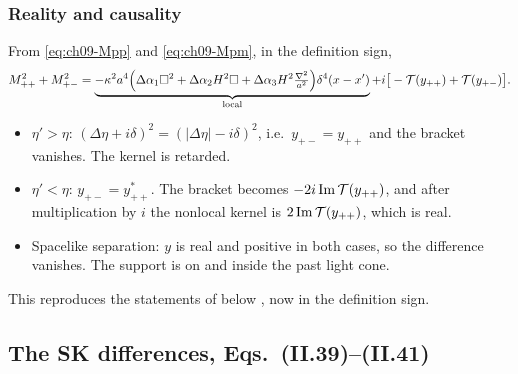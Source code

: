 \subsubsection{Reality and causality}
From \eqref{eq:ch09-Mpp} and \eqref{eq:ch09-Mpm}, in the definition sign,
\begin{equation}
M^2_{++}+M^2_{+-}=\underbrace{-\kappa^2a^4\Big(\Delta\alpha_1\square^2+\Delta\alpha_2H^2\square+\Delta\alpha_3H^2\tfrac{\nabla^2}{a^2}\Big)\delta^4(x-x')}_{\text{local}}
+i\big[-\mathcal{T}(y_{++})+\mathcal{T}(y_{+-})\big].
\label{eq:ch09-retarded}
\end{equation}
\begin{itemize}[leftmargin=14pt]
\item $\eta'>\eta$: $(\Delta\eta+i\delta)^2=(|\Delta\eta|-i\delta)^2$, i.e.\ $y_{+-}=y_{++}$ and the bracket vanishes. The kernel is retarded.
\item $\eta'<\eta$: $y_{+-}=y_{++}^*$. The bracket becomes $-2i\,\mathrm{Im}\,\mathcal{T}(y_{++})$, and after multiplication by $i$ the nonlocal kernel is $2\,\mathrm{Im}\,\mathcal{T}(y_{++})$, which is real.
\item Spacelike separation: $y$ is real and positive in both cases, so the difference vanishes. The support is on and inside the past light cone.
\end{itemize}
This reproduces the statements of \PII{} below , now in the definition sign.

\subsection{The SK differences, Eqs.~(II.39)--(II.41)}
\label{sec:t18-diff}

